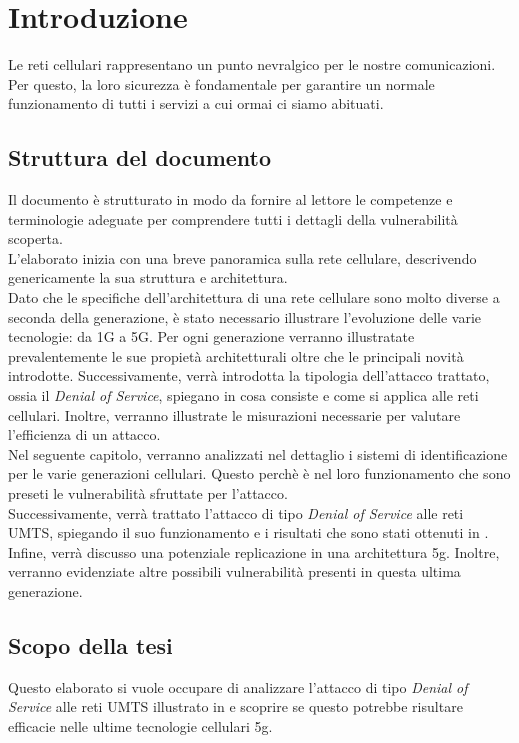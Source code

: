 \section{Introduzione}
Le reti cellulari rappresentano un punto nevralgico per le nostre comunicazioni.
Per questo, la loro sicurezza è fondamentale per garantire un normale funzionamento
di tutti i servizi a cui ormai ci siamo abituati.\\
\subsection{Struttura del documento}
Il documento è strutturato in modo da fornire al lettore le competenze e terminologie adeguate per comprendere tutti i dettagli della 
vulnerabilità scoperta.\\
L'elaborato inizia con una breve panoramica sulla rete cellulare, descrivendo genericamente la sua struttura e architettura.\\ 
Dato che le specifiche dell'architettura di una rete cellulare sono molto diverse a seconda della generazione, è stato 
necessario illustrare l'evoluzione delle varie tecnologie: da 1G a 5G. 
Per ogni generazione verranno illustratate prevalentemente le sue propietà architetturali oltre che le principali novità introdotte.
Successivamente, verrà introdotta la tipologia dell'attacco trattato, ossia il \textit{Denial of Service}, spiegano in cosa consiste
e come si applica alle reti cellulari. Inoltre, verranno illustrate le misurazioni necessarie per valutare l'efficienza di un attacco.\\
Nel seguente capitolo, verranno analizzati nel dettaglio i sistemi di identificazione per le varie generazioni cellulari. Questo perchè è nel 
loro funzionamento che sono preseti le vulnerabilità sfruttate per l'attacco.\\
Successivamente, verrà trattato l'attacco di tipo \textit{Denial of Service} alle reti UMTS, spiegando il suo funzionamento e i risultati che sono stati
ottenuti in \cite{umts-dos}.
Infine, verrà discusso una potenziale replicazione in una architettura 5g. Inoltre, verranno evidenziate altre possibili vulnerabilità presenti in questa 
ultima generazione.
\subsection{Scopo della tesi}
Questo elaborato si vuole occupare di analizzare l'attacco di tipo \textit{Denial of Service}
alle reti UMTS illustrato in \cite{umts-dos} e scoprire se questo potrebbe risultare efficacie nelle ultime
tecnologie cellulari 5g.